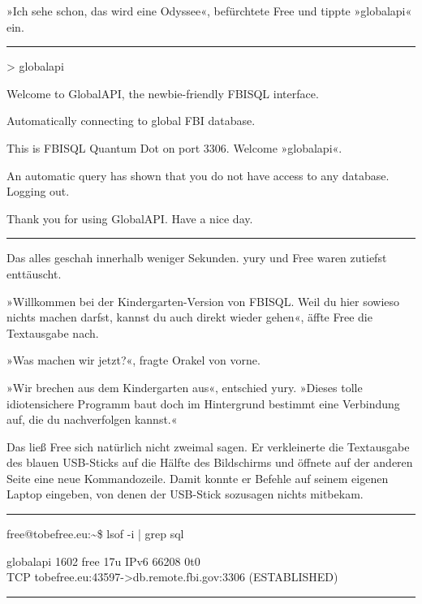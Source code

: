 »Ich sehe schon, das wird eine Odyssee«, befürchtete Free und tippte »globalapi« ein.

\noindent \parbox{\textwidth}{ \vspace{3ex} \hrule \vspace{3ex}

    \begin{footnotesize}
    \begin{ttfamily}

\noindent > globalapi

\noindent Welcome to GlobalAPI, the newbie-friendly FBISQL interface.

\noindent Automatically connecting to global FBI database.

\noindent This is FBISQL Quantum Dot on port 3306. Welcome »globalapi«.

\noindent An automatic query has shown that you do not have access to any database. Logging out.

\noindent Thank you for using GlobalAPI. Have a nice day.

    \end{ttfamily}
    \end{footnotesize}

\vspace{3ex} \hrule \vspace{3ex} }

Das alles geschah innerhalb weniger Sekunden. yury und Free waren zutiefst enttäuscht.

»Willkommen bei der Kindergarten-Version von FBISQL. Weil du hier sowieso nichts machen darfst, kannst du auch direkt wieder gehen«, äffte Free die Textausgabe nach.

»Was machen wir jetzt?«, fragte Orakel von vorne.

»Wir brechen aus dem Kindergarten aus«, entschied yury. »Dieses tolle idiotensichere Programm baut doch im Hintergrund bestimmt eine Verbindung auf, die du nachverfolgen kannst.«

Das ließ Free sich natürlich nicht zweimal sagen. Er verkleinerte die Textausgabe des blauen USB-Sticks auf die Hälfte des Bildschirms und öffnete auf der anderen Seite eine neue Kommandozeile. Damit konnte er Befehle auf seinem eigenen Laptop eingeben, von denen der USB-Stick sozusagen nichts mitbekam.

\noindent \parbox{\textwidth}{ \vspace{3ex} \hrule \vspace{3ex}

    \begin{footnotesize}
    \begin{ttfamily}

\noindent free@tobefree.eu:\textasciitilde{}\$ lsof -i | grep sql

\noindent globalapi 1602 free 17u IPv6 66208 0t0\\ TCP tobefree.eu:43597->db.remote.fbi.gov:3306 (ESTABLISHED)

    \end{ttfamily}
    \end{footnotesize}

\vspace{3ex} \hrule \vspace{3ex} }

